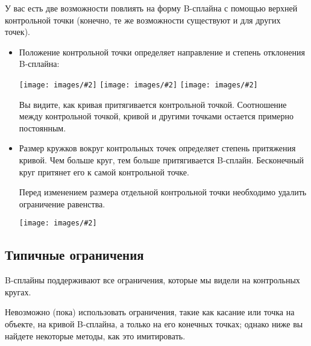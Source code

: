 \documentclass[12pt,titlepage]{article}
\newcommand{\img}[2]{\vspace{2ex}\noindent\texttt{[image: images/\#2]}}
\begin{document}
У вас есть две возможности повлиять на форму B-сплайна с помощью верхней контрольной точки (конечно, те же возможности существуют и для других точек).

\begin{itemize}
\item Положение контрольной точки определяет направление и степень отклонения B-сплайна:

{\newcommand{\scale}{0.54}
\hspace*{-0.8\leftmargini}\img{scale=\scale}{BSplineMoveUp}%
\hfill%
\img{scale=\scale}{BSplineMoveLeft}%
\hfill%
\img{scale=\scale}{BSplineMoveRight}}

Вы видите, как кривая притягивается контрольной точкой. Соотношение между контрольной точкой, кривой и другими точками остается примерно постоянным.

\item Размер кружков вокруг контрольных точек определяет степень притяжения кривой. Чем больше круг, тем больше притягивается B-сплайн. Бесконечный круг притянет его к самой контрольной точке.
      
      Перед изменением размера отдельной контрольной точки необходимо удалить ограничение равенства.

\img{}{BSplineBigCircle}
\end{itemize}

\subsection*{Типичные ограничения}

B-сплайны поддерживают все ограничения, которые мы видели на контрольных кругах.

Невозможно (пока) использовать ограничения, такие как касание или точка на объекте, на кривой B-сплайна, а только на его конечных точках; однако ниже вы найдете некоторые методы, как это имитировать.
\end{document}
